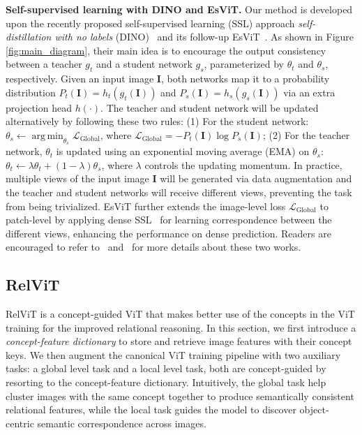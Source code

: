 \documentclass{article} \usepackage{iclr2022_conference,times}
\DeclareMathOperator*{\argmin}{arg\,min}
\renewcommand{\paragraph}[1]{\noindent\textbf{#1.}}
\newcommand{\image}{\mathbf{I}}
\newcommand{\relvit}{RelViT }
\newcommand{\loss}{\mathcal{L}}
\begin{document}
\paragraph{Self-supervised learning with DINO and EsViT} 
Our method is developed upon the recently proposed self-supervised learning (SSL) approach \textit{self-distillation with no labels} (DINO)~\citep{dino} and its follow-up EsViT~\citep{esvit}. As shown in Figure \ref{fig:main_diagram}, their main idea is to encourage the output consistency between a teacher $g_t$ and a student network $g_s$, parameterized by $\theta_t$ and $\theta_s$, respectively. Given an input image $\image$, both networks map it to a probability distribution $P_t(\image) = h_t(g_t(\image))$ and $P_s(\image) = h_s(g_s(\image))$ via an extra projection head $h(\cdot)$. The teacher and student network will be updated alternatively by following these two rules: (1) For the student network: $\theta_s \leftarrow \argmin_{\theta_s}\loss_{\operatorname{Global}}$, where $\loss_{\operatorname{Global}} = -P_t(\image)\log P_s(\image)$; (2) For the teacher network, $\theta_t$ is updated using an exponential moving average (EMA)
on $\theta_s$: $\theta_t \leftarrow \lambda\theta_t + (1-\lambda)\theta_s$, where $\lambda$ controls the updating momentum. In practice, multiple views of the input image $\image$ will be generated via data augmentation and the teacher and student networks will receive different views, preventing the task from being trivialized. EsViT further extends the image-level loss $\loss_{\operatorname{Global}}$ to patch-level by applying dense SSL~\citep{densecl} for learning correspondence between the different views, enhancing the performance on dense prediction. Readers are encouraged to refer to~\cite{dino} and~\cite{esvit} for more details about these two works.



\vspace{-0.14in}
\subsection{RelViT}
 \vskip-0.1in
\label{sec:relvit}
\relvit is a concept-guided ViT that makes better use of the concepts in the ViT training for the improved relational reasoning. In this section, we first introduce a \emph{concept-feature dictionary} to store and retrieve image features with their concept keys. We then augment the canonical ViT training pipeline with two auxiliary tasks: a global level task and a local level task, both are concept-guided by resorting to the concept-feature dictionary. Intuitively, the global task help cluster images with the same concept together to produce semantically consistent relational features, while the local task guides the model to discover object-centric semantic correspondence across images. 
\end{document}
